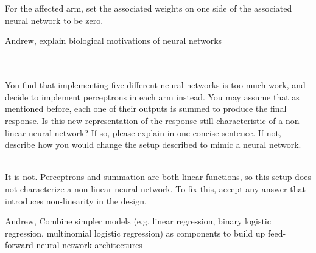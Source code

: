 \begin{parts}
\begin{subparts}
     \\
     \\
     \fillwithlines{12em}
    \begin{soln}
     For the affected arm, set the associated weights on one side of the associated neural network to be zero.
     \end{soln} 
     \begin{qauthor}
    Andrew, explain biological motivations of neural networks
    \end{qauthor}
     \\
     \\
     \subpart[2] You find that implementing five different neural networks is too much work, and decide to implement perceptrons in each arm instead. You may assume that as mentioned before, each one of their outputs is summed to produce the final response. Is this new representation of the response still characteristic of a non-linear neural network? If so, please explain in one concise sentence. If not, describe how you would change the setup described to mimic a neural network.
     \\
     \\
     \fillwithlines{12em}
     \begin{soln}
     It is not. Perceptrons and summation are both linear functions, so this setup does not characterize a non-linear neural network. To fix this, accept any answer that introduces non-linearity in the design.
     \end{soln} 
     \begin{qauthor}
    Andrew, Combine simpler models (e.g. linear regression, binary logistic regression, multinomial logistic regression) as components to build up feed-forward neural network architectures
    \end{qauthor}

     \end{subparts}



\end{parts}
